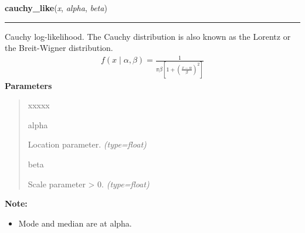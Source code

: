 \hspace{.8\funcindent}\begin{boxedminipage}{\funcwidth}

    \raggedright \textbf{cauchy\_like}(\textit{x}, \textit{alpha}, \textit{beta})

    \vspace{-1.5ex}

    \rule{\textwidth}{1pt}
\setlength{\parskip}{2ex}

Cauchy log-likelihood. The Cauchy distribution is also known as the
Lorentz or the Breit-Wigner distribution.
\begin{equation*}\begin{split}f(x \mid \alpha, \beta) = \frac{1}{\pi \beta [1 + (\frac{x-\alpha}{\beta})^2]}\end{split}\end{equation*}\setlength{\parskip}{1ex}
      \textbf{Parameters}
      \vspace{-1ex}

      \begin{quote}
        \begin{Ventry}{xxxxx}

          \item[alpha]


Location parameter.
            {\it (type=float)}

          \item[beta]


Scale parameter {\textgreater} 0.
            {\it (type=float)}

        \end{Ventry}

      \end{quote}

\textbf{Note:} \begin{itemize}
\item {} 
Mode and median are at alpha.

\end{itemize}


    \end{boxedminipage}

    \label{pymc:distributions:chi2_like}

    \vspace{0.5ex}

